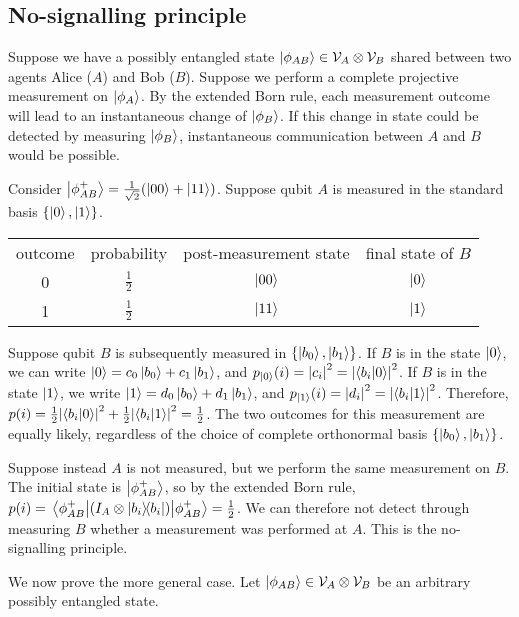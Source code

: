 \subsection{No-signalling principle}
Suppose we have a possibly entangled state \( \ket{\phi_{AB}} \in \mathcal V_A \otimes \mathcal V_B \) shared between two agents Alice (\( A \)) and Bob (\( B \)).
Suppose we perform a complete projective measurement on \( \ket{\phi_A} \).
By the extended Born rule, each measurement outcome will lead to an instantaneous change of \( \ket{\phi_B} \).
If this change in state could be detected by measuring \( \ket{\phi_B} \), instantaneous communication between \( A \) and \( B \) would be possible.

Consider \( \ket{\phi_{AB}^+} = \frac{1}{\sqrt{2}}\qty(\ket{00} + \ket{11}) \).
Suppose qubit \( A \) is measured in the standard basis \( \qty{\ket{0}, \ket{1}} \).
\begin{center}
    \begin{tabular}{c c c c}
        outcome & probability & post-measurement state & final state of \( B \) \\
        0 & \( \frac{1}{2} \) & \( \ket{00} \) & \( \ket{0} \) \\
        1 & \( \frac{1}{2} \) & \( \ket{11} \) & \( \ket{1} \)
    \end{tabular}
\end{center}
Suppose qubit \( B \) is subsequently measured in \( \qty{\ket{b_0}, \ket{b_1}} \).
If \( B \) is in the state \( \ket{0} \), we can write \( \ket{0} = c_0\ket{b_0} + c_1\ket{b_1} \), and \( p_{\ket{0}}(i) = \abs{c_i}^2 = \abs{\ip{b_i}{0}}^2 \).
If \( B \) is in the state \( \ket{1} \), we write \( \ket{1} = d_0\ket{b_0} + d_1\ket{b_1} \), and \( p_{\ket{1}}(i) = \abs{d_i}^2 = \abs{\ip{b_i}{1}}^2 \).
Therefore, \( p(i) = \frac{1}{2} \abs{\ip{b_i}{0}}^2 + \frac{1}{2} \abs{\ip{b_i}{1}}^2 = \frac{1}{2} \).
The two outcomes for this measurement are equally likely, regardless of the choice of complete orthonormal basis \( \qty{\ket{b_0}, \ket{b_1}} \).

Suppose instead \( A \) is not measured, but we perform the same measurement on \( B \).
The initial state is \( \ket{\phi_{AB}^+} \), so by the extended Born rule, \( p(i) = \ev{\qty(I_A \otimes \op{b_i}{b_i})}{\phi_{AB}^+} = \frac{1}{2} \).
We can therefore not detect through measuring \( B \) whether a measurement was performed at \( A \).
This is the no-signalling principle.

We now prove the more general case.
Let \( \ket{\phi_{AB}} \in \mathcal V_A \otimes \mathcal V_B \) be an arbitrary possibly entangled state.


